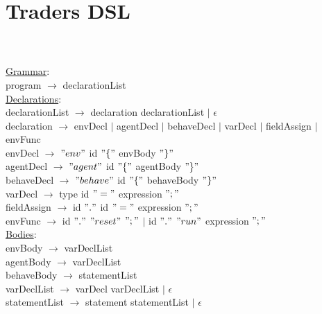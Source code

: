 \documentclass{article}
\begin{document}
\chapter{Traders DSL}\\ \\

\underline{Grammar}: \\

program $\rightarrow$ declarationList \\

\underline{Declarations}: \\

declarationList $\rightarrow$ declaration declarationList  $\vert$ $\epsilon$ \\

declaration $\rightarrow$ envDecl $\vert$ agentDecl $\vert$ behaveDecl $\vert$ varDecl $\vert$ fieldAssign $\vert$ envFunc\\

envDecl $\rightarrow$ $"env"$ id $"\{"$ envBody $"\}"$ \\

agentDecl $\rightarrow$ $"agent"$ id $"\{"$ agentBody $"\}"$ \\

behaveDecl $\rightarrow$ $"behave"$ id $"\{"$ behaveBody $"\}"$ \\

varDecl $\rightarrow$ type id $"="$ expression $";"$ \\

fieldAssign $\rightarrow$ id $"."$ id $"="$ expression $";"$ \\

envFunc $\rightarrow$ id $"."$ $"reset"$ $";"$ $\vert$ id $"."$ $"run"$ expression $";"$\\

\underline{Bodies}: \\

envBody $\rightarrow$ varDeclList \\

agentBody $\rightarrow$ varDeclList \\

behaveBody $\rightarrow$ statementList \\

varDeclList $\rightarrow$ varDecl varDeclList $\vert$ $\epsilon$ \\

statementList $\rightarrow$ statement statementList $\vert$ $\epsilon$ \\
\end{document}
